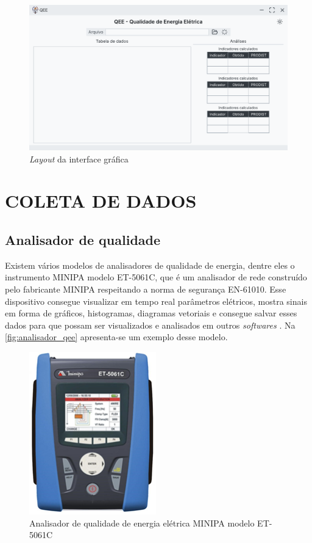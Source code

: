 \begin{figure}[H]
	\centering
	\caption{\textit{Layout} da interface gráfica}
	\label{fig:main_windown}
	\includegraphics[width=16cm]{illustrations/figures/main_windown.pdf}
\end{figure}

\section{COLETA DE DADOS}

\subsection{Analisador de qualidade}

Existem vários modelos de analisadores de qualidade de energia, dentre eles o instrumento MINIPA modelo ET-5061C, que é um analisador de rede construído pelo fabricante MINIPA respeitando a norma de segurança EN-61010. Esse dispositivo consegue visualizar em tempo real parâmetros elétricos, mostra sinais em forma de gráficos, histogramas, diagramas vetoriais e consegue salvar esses dados para que possam ser visualizados e analisados em outros \textit{softwares} \cite{ref:minipa_2019}. Na \autoref{fig:analisador_qee} apresenta-se um exemplo desse modelo.

\begin{figure}[H]
	\centering
	\caption{Analisador de qualidade de energia elétrica MINIPA modelo ET-5061C}
	\label{fig:analisador_qee}
	\includegraphics[width=5.5cm]{illustrations/figures/analisador_qee.png}
\end{figure}

